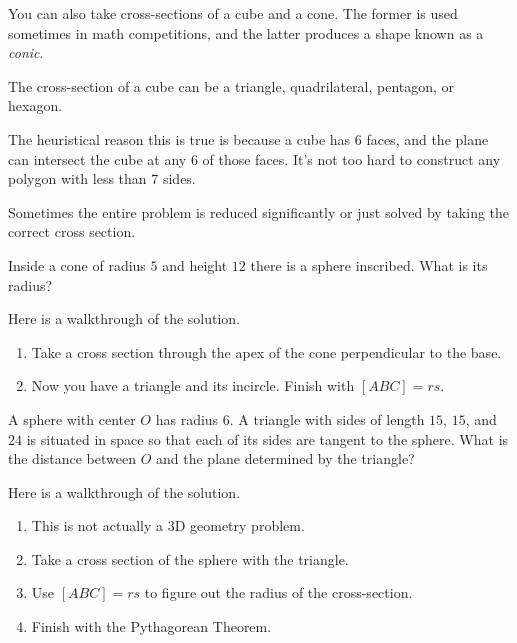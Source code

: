 You can also take cross-sections of a cube and a cone. The former is used sometimes in math competitions, and the latter produces a shape known as a \textit{conic}.

\begin{theo}
The cross-section of a cube can be a triangle, quadrilateral, pentagon, or hexagon.
\end{theo}

The heuristical reason this is true is because a cube has $6$ faces, and the plane can intersect the cube at any $6$ of those faces. It's not too hard to construct any polygon with less than $7$ sides.

Sometimes the entire problem is reduced significantly or just solved by taking the correct cross section.

\begin{exam}
Inside a cone of radius $5$ and height $12$ there is a sphere inscribed. What is its radius?
\end{exam}
\begin{sol}
Here is a walkthrough of the solution.
\begin{enumerate}
    \item Take a cross section through the apex of the cone perpendicular to the base.
    
    \item Now you have a triangle and its incircle. Finish with $[ABC]=rs.$
\end{enumerate}
\end{sol}

\begin{exam}[AMC 10A 2019/21]
A sphere with center $O$ has radius 6. A triangle with sides of length $15$, $15$, and $24$ is situated in space so that each of its sides are tangent to the sphere. What is the distance between $O$ and the plane determined by the triangle?
\end{exam}
\begin{sol}
Here is a walkthrough of the solution.
\begin{enumerate}
    \item This is not actually a 3D geometry problem.

    \item Take a cross section of the sphere with the triangle.
    
    \item Use $[ABC]=rs$ to figure out the radius of the cross-section.
    
    \item Finish with the Pythagorean Theorem.
\end{enumerate}
\end{sol}

